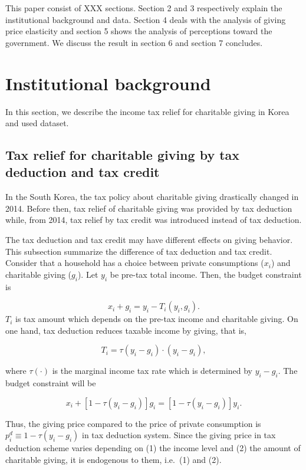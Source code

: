 \documentclass[
]{article}
\begin{document}
This paper consist of XXX sections. Section 2 and 3 respectively explain the institutional background and data. Section 4 deals with the analysis of giving price elasticity and section 5 shows the analysis of perceptions toward the government. We discuss the result in section 6 and section 7 concludes.

\hypertarget{institutional-background}{%
\section{Institutional background}\label{institutional-background}}

In this section, we describe the income tax relief for charitable giving in Korea and used dataset.

\hypertarget{tax-relief-for-charitable-giving-by-tax-deduction-and-tax-credit}{%
\subsection{Tax relief for charitable giving by tax deduction and tax credit}\label{tax-relief-for-charitable-giving-by-tax-deduction-and-tax-credit}}

In the South Korea, the tax policy about charitable giving drastically changed in 2014. Before then, tax relief of charitable giving was provided by tax deduction while, from 2014, tax relief by tax credit was introduced instead of tax deduction.

The tax deduction and tax credit may have different effects on giving behavior. This subsection summarize the difference of tax deduction and tax credit.
Consider that a household has a choice between private consumptions (\(x_i\)) and charitable giving (\(g_i\)). Let \(y_i\) be pre-tax total income.
Then, the budget constraint is

\[
    x_i + g_i = y_i - T_i(y_i, g_i).
\]
\(T_i\) is tax amount which depends on the pre-tax income and charitable giving.
On one hand, tax deduction reduces taxable income by giving, that is,

\[
    T_i = \tau(y_i - g_i) \cdot (y_i - g_i),
\]

where \(\tau(\cdot)\) is the marginal income tax rate which is determined by \(y_i - g_i\). The budget constraint will be

\[
    x_i + [1 - \tau(y_i - g_i)]g_i = [1 - \tau(y_i - g_i)] y_i.
\]

Thus, the giving price compared to the price of private consumption is \(p_i^{d} \equiv 1 - \tau(y_i - g_i)\) in tax deduction system. Since the giving price in tax deduction scheme varies depending on (1) the income level and (2) the amount of charitable giving, it is endogenous to them, i.e.~(1) and (2).
\end{document}
